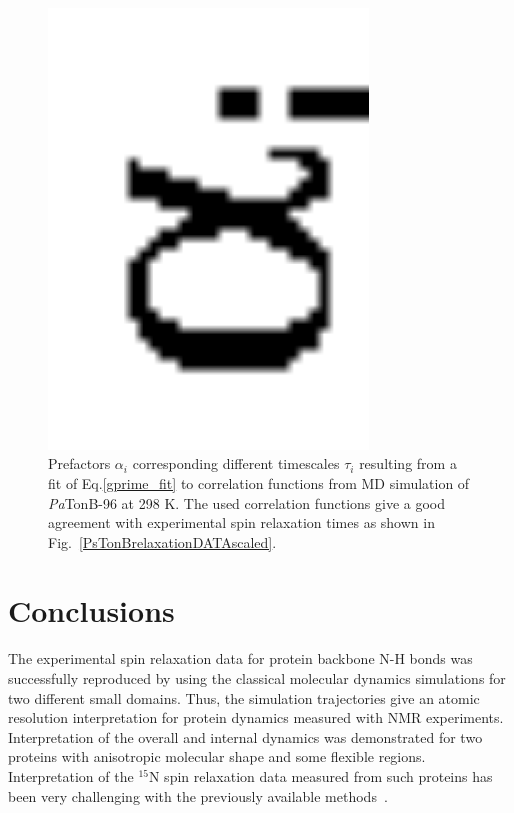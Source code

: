 \documentclass[journal=jpcbfk,manuscript=article]{achemso}
\begin{document}
\begin{figure}[!h]
  \includegraphics[width=8.5cm]{../Figs/coeffsPLOT.eps}%
  \caption{Prefactors $\alpha_i$ corresponding different timescales $\tau_i$
    resulting from a fit of Eq.\ref{gprime_fit} to correlation functions from
    MD simulation of {\it Pa}TonB-96 at 298 K. The used correlation functions give
    a good agreement with experimental spin relaxation times as shown in
    Fig.~\ref{PsTonBrelaxationDATAscaled}.  \label{coeffsPLOT}}%
\end{figure}


\section{Conclusions}
The experimental spin relaxation data for protein backbone N-H bonds
was successfully reproduced by using the classical molecular dynamics
simulations for two different small domains.
Thus, the simulation trajectories give an atomic resolution
interpretation for protein dynamics measured with NMR experiments.
Interpretation of the overall and internal dynamics was demonstrated for
two proteins with anisotropic molecular shape and some flexible regions. 
Interpretation of the $^{15}$N spin relaxation data measured from
such proteins has been very challenging with the previously available
methods~\cite{barbato92,luginbuhl97}.
\end{document}
